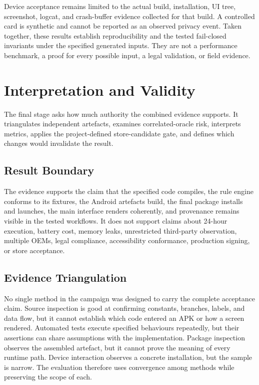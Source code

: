 Device acceptance remains limited to the actual build, installation, UI tree, screenshot, logcat, and crash-buffer evidence collected for that build. A controlled card is synthetic and cannot be reported as an observed privacy event. Taken together, these results establish reproducibility and the tested fail-closed invariants under the specified generated inputs. They are not a performance benchmark, a proof for every possible input, a legal validation, or field evidence.

\section{Interpretation and Validity}

The final stage asks how much authority the combined evidence supports. It triangulates independent artefacts, examines correlated-oracle risk, interprets metrics, applies the project-defined store-candidate gate, and defines which changes would invalidate the result.

\subsection{Result Boundary}

The evidence supports the claim that the specified code compiles, the rule engine conforms to its fixtures, the Android artefacts build, the final package installs and launches, the main interface renders coherently, and provenance remains visible in the tested workflows. It does not support claims about 24-hour execution, battery cost, memory leaks, unrestricted third-party observation, multiple OEMs, legal compliance, accessibility conformance, production signing, or store acceptance.

\subsection{Evidence Triangulation}

No single method in the campaign was designed to carry the complete acceptance claim. Source inspection is good at confirming constants, branches, labels, and data flow, but it cannot establish which code entered an APK or how a screen rendered. Automated tests execute specified behaviours repeatedly, but their assertions can share assumptions with the implementation. Package inspection observes the assembled artefact, but it cannot prove the meaning of every runtime path. Device interaction observes a concrete installation, but the sample is narrow. The evaluation therefore uses convergence among methods while preserving the scope of each.

